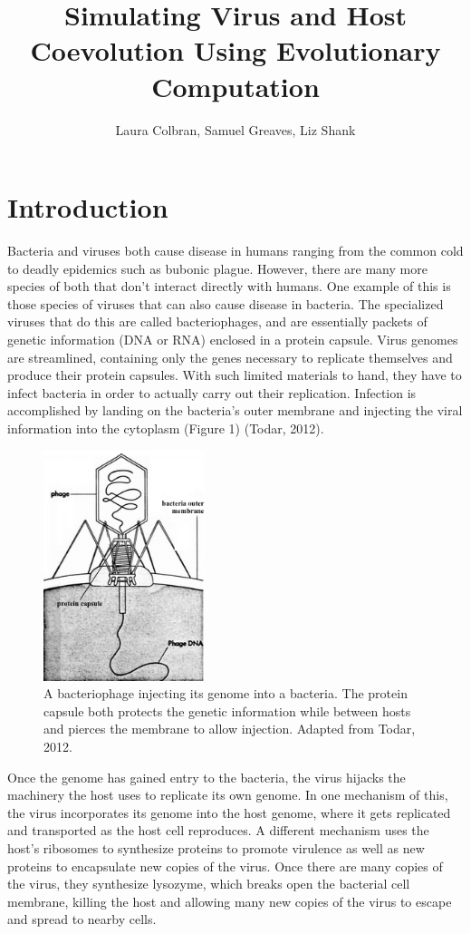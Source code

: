 \documentclass[11pt, oneside]{article}
\title{Simulating Virus and Host Coevolution Using Evolutionary Computation}
\author{Laura Colbran, Samuel Greaves, Liz Shank}
\date{}
\begin{document}
\maketitle
\section{Introduction}
Bacteria and viruses both cause disease in humans ranging from the common cold to deadly epidemics such as bubonic plague. However, there are many more species of both that don't interact directly with humans. One example of this is those species of viruses that can also cause disease in bacteria. The specialized viruses that do this are called bacteriophages, and are essentially packets of genetic information (DNA or RNA) enclosed in a protein capsule. Virus genomes are streamlined, containing only the genes necessary to replicate themselves and produce their protein capsules. With such limited materials to hand, they have to infect bacteria in order to actually carry out their replication. Infection is accomplished by landing on the bacteria's outer membrane and injecting the viral information into the cytoplasm (Figure 1) (Todar, 2012).

\begin{figure}[H]
	\centering
	\includegraphics[width=0.42\textwidth]{figure1.png}
	\caption{A bacteriophage injecting its genome into a bacteria. The protein capsule both protects the 			genetic information while between hosts and pierces the membrane to allow injection. Adapted 			from Todar, 2012.}
\end{figure}

Once the genome has gained entry to the bacteria, the virus hijacks the machinery the host uses to replicate its own genome. In one mechanism of this, the virus incorporates its genome into the host genome, where it gets replicated and transported as the host cell reproduces. A different mechanism uses the host's ribosomes to synthesize proteins to promote virulence as well as new proteins to encapsulate new copies of the virus. Once there are many copies of the virus, they synthesize lysozyme, which breaks open the bacterial cell membrane, killing the host and allowing many new copies of the virus to escape and spread to nearby cells.
\end{document}
